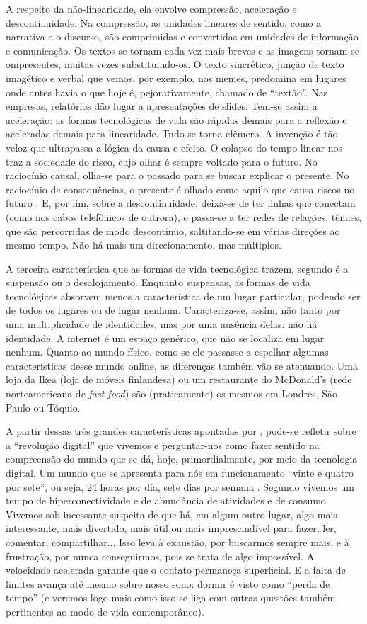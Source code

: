 A respeito da não-linearidade, ela envolve compressão, aceleração e descontinuidade.  Na compressão, as unidades lineares de sentido, como a narrativa e o discurso, são comprimidas e convertidas em unidades de informação e comunicação. Os textos se tornam cada vez mais breves e as imagens tornam-se onipresentes, muitas vezes substituindo-os. O texto sincrético, junção de texto imagético e verbal que vemos, por exemplo, nos memes, predomina em lugares onde antes havia o que hoje é, pejorativamente, chamado de “textão”. Nas empresas, relatórios dão lugar a apresentações de slides. Tem-se assim a aceleração: as formas tecnológicas de vida são rápidas demais para a reflexão e aceleradas demais para linearidade. Tudo se torna efêmero. A invenção é tão veloz que ultrapassa a lógica da causa-e-efeito. O colapso do tempo linear nos traz a sociedade do risco, cujo olhar é sempre voltado para o futuro. No raciocínio causal, olha-se para o passado para se buscar explicar o presente. No raciocínio de consequências, o presente é olhado como aquilo que causa riscos no futuro \cite{lash2012}. E, por fim, sobre a descontinuidade, deixa-se de ter linhas que conectam (como nos cabos telefônicos de outrora), e passa-se a ter redes de relações, tênues, que são percorridas de modo descontínuo, saltitando-se em várias direções ao mesmo tempo. Não há mais um direcionamento, mas múltiplos.

A terceira característica que as formas de vida tecnológica trazem, segundo \textcite{lash2012} é a suspensão ou o desalojamento. Enquanto suspensas, as formas de vida tecnológicas absorvem menos a característica de um lugar particular, podendo ser de todos os lugares ou de lugar nenhum. Caracteriza-se, assim, não tanto por uma multiplicidade de identidades, mas por uma ausência delas: não há identidade. A internet é um espaço genérico, que não se localiza em lugar nenhum. Quanto ao mundo físico, como se ele passasse a espelhar algumas características desse mundo online, as diferenças também vão se atenuando. Uma loja da Ikea (loja de móveis finlandesa) ou um restaurante do McDonald’s (rede norteamericana de \textit{fast food}) são (praticamente) os mesmos em Londres, São Paulo ou Tóquio.

A partir dessas três grandes características apontadas por \textcite{lash2012}, pode-se refletir sobre a “revolução digital” que vivemos e perguntar-nos como fazer sentido na compreensão do mundo que se dá, hoje, primordialmente, por meio da tecnologia digital. Um mundo que se apresenta para nós em funcionamento “vinte e quatro por sete”, ou seja, 24 horas por dia, sete dias por semana \cite{crary}. Segundo \textcite{sibilia2020} vivemos um tempo de hiperconectividade e de abundância de atividades e de consumo. Vivemos sob incessante suspeita de que há, em algum outro lugar, algo mais interessante, mais divertido, mais útil ou mais imprescindível para fazer, ler, comentar, compartilhar... Isso leva à exaustão, por buscarmos sempre mais, e à frustração, por nunca conseguirmos, pois se trata de algo impossível. A velocidade acelerada garante que o contato permaneça superficial. E a falta de limites avança até mesmo sobre nosso sono: dormir é visto como “perda de tempo” (e veremos logo mais como isso se liga com outras questões também pertinentes ao modo de vida contemporâneo).
